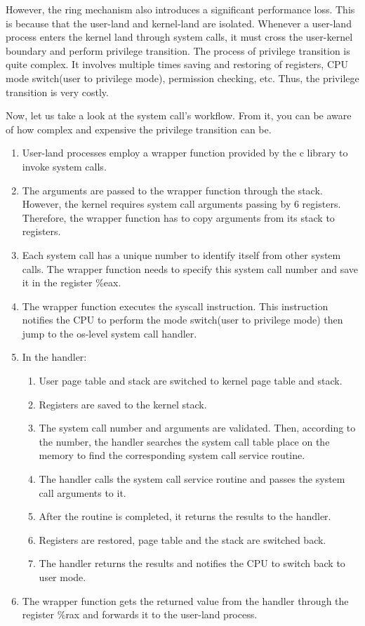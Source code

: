  However, the ring mechanism also introduces a significant performance loss. 
 This is because that the user-land and kernel-land are isolated. Whenever a user-land 
 process enters the kernel land through system calls, it must cross the user-kernel boundary 
 and perform privilege transition.  The process of privilege transition is quite complex. 
 It involves multiple times saving and restoring of registers, CPU mode switch(user to privilege mode), 
 permission checking, etc. Thus, the privilege transition is very costly.

 Now, let us take a look at the system call's workflow\cite{8}. From it, you can be aware of 
 how complex and expensive the privilege transition can be.
 \begin{enumerate}
  \item User-land processes employ a wrapper function provided by the c library to invoke system calls.
  \item The arguments are passed to the wrapper function through the stack. However, the kernel requires system call arguments passing by 6 registers. Therefore, the wrapper function has to copy arguments from its stack to registers.
  \item Each system call has a unique number to identify itself from other system calls. The wrapper function needs to specify this system call number and save it in the register \%eax.
  \item The wrapper function executes the syscall instruction.  This instruction notifies the CPU to perform the mode switch(user to privilege mode) then jump to the os-level system call handler.
  \item In the handler:
  \begin{enumerate}
    \item User page table and stack are switched to kernel page table and stack.
    \item Registers are saved to the kernel stack.
    \item The system call number and arguments are validated. Then, according to the number, the handler searches the system call table place on the memory to find the corresponding system call service routine.
    \item The handler calls the system call service routine and passes the system call arguments to it.
    \item After the routine is completed, it returns the results to the handler.
    \item Registers are restored, page table and the stack are switched back.
    \item The handler returns the results and notifies the CPU to switch back to user mode.
  \end{enumerate}
  \item The wrapper function gets the returned value from the handler through the register \%rax and forwards it to the user-land process.
  
\end{enumerate}

